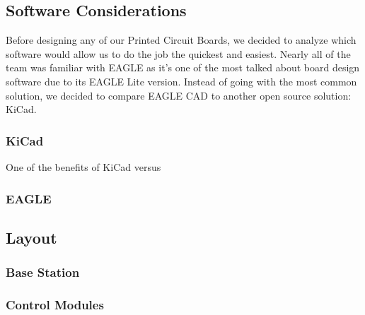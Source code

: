 
\subsection{Software Considerations}
Before designing any of our Printed Circuit Boards, we decided to analyze which
software would allow us to do the job the quickest and easiest. Nearly all of
the team was familiar with EAGLE as it's one of the most talked about board
design software due to its EAGLE Lite version. Instead of going with the most
common solution, we decided to compare EAGLE CAD to another open source
solution: KiCad.

\subsubsection{KiCad}
One of the benefits of KiCad versus

\subsubsection{EAGLE}

\subsection{Layout}

\subsubsection{Base Station}

\subsubsection{Control Modules}

